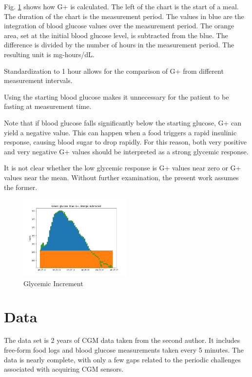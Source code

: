 \documentclass[conference]{IEEEtran}
\begin{document}
Fig. \ref{fig:gplus_illustrated} shows how G+ is calculated. The left of the chart is the start of a meal. The duration of the chart is the measurement period. The values in blue are the integration of blood glucose values over the measurement period. The orange area, set at the initial blood glucose level, is subtracted from the blue. The difference is divided by the number of hours in the measurement period. The resulting unit is mg-hours/dL.

Standardization to 1 hour allows for the comparison of G+ from different measurement intervals.

Using the starting blood glucose makes it unnecessary for the patient to be fasting at measurement time.

Note that if blood glucose falls significantly below the starting glucose, G+ can yield a negative value. This can happen when a food triggers a rapid insulinic response, causing blood sugar to drop rapidly. For this reason, both very positive and very negative G+ values should be interpreted as a strong glycemic response.

It is not clear whether the low glycemic response is G+ values near zero or G+ values near the mean. Without further examination, the present work assumes the former.

\begin{figure}[tbp]
    \includegraphics[width=0.5\textwidth]{images/gplus_illustrated.png}
    \caption{Glycemic Increment}
    \label{fig:gplus_illustrated}
\end{figure}

\section{Data}

The data set is 2 years of CGM data taken from the second author. It includes free-form food logs and blood glucose measurements taken every 5 minutes. The data is nearly complete, with only a few gaps related to the periodic challenges associated with acquiring CGM sensors.
\end{document}
